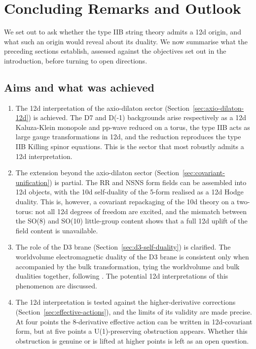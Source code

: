\section{Concluding Remarks and Outlook}
\label{sec:outlook}

We set out to ask whether the type IIB string theory admits a 12d origin, and what such an origin would reveal about its \SLZ{} duality.
We now summarise what the preceding sections establish, assessed against the objectives set out in the introduction, before turning to open directions.

\subsection{Aims and what was achieved}

\begin{enumerate}
    \item The 12d interpretation of the axio-dilaton sector (Section~\ref{sec:axio-dilaton-12d}) is achieved. 
    The D7 and D(-1) backgrounds arise respectively as a 12d Kaluza-Klein monopole and pp-wave reduced on a torus, the type IIB \SLZ{} acts as large gauge transformations in 12d, and the reduction reproduces the type IIB Killing spinor equations. 
    This is the sector that most robustly admits a 12d interpretation.
    \item The extension beyond the axio-dilaton sector (Section~\ref{sec:covariant-unification}) is partial. The RR and NSNS form fields can be assembled into 12d objects, with the 10d self-duality of the 5-form realised as a 12d Hodge duality. 
    This is, however, a covariant repackaging of the 10d theory on a two-torus: not all 12d degrees of freedom are excited, and the mismatch between the SO(8) and SO(10) little-group content shows that a full 12d uplift of the field content is unavailable.
    \item The role of the D3 brane (Section~\ref{sec:d3-self-duality}) is clarified. The worldvolume electromagnetic \SLZ{} duality of the D3 brane is consistent only when accompanied by the bulk \SLZ{} transformation, tying the worldvolume and bulk dualities together, following \cite{Tseytlin:1996it}.
    The potential 12d interpretations of this phenomenon are discussed.
    \item The 12d interpretation is tested against the higher-derivative corrections (Section~\ref{sec:effective-actions}), and the limits of its validity are made precise. 
    At four points the 8-derivative effective action can be written in 12d-covariant form, but at five points a U(1)-preserving obstruction appears. 
    Whether this obstruction is genuine or is lifted at higher points is left as an open question.
\end{enumerate}

